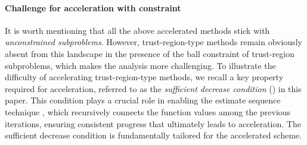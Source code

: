 \documentclass{article}
\theoremstyle{plain}
\theoremstyle{definition}
\theoremstyle{remark}
\newcommand{\cz}[1]{{\color{rr} #1}}
\begin{document}
\paragraph{Challenge for acceleration with constraint}
It is worth mentioning that all the above accelerated methods stick with \emph{unconstrained subproblems}.
However, trust-region-type methods remain obviously absent from this landscape in the presence of the ball constraint of trust-region subproblems, which makes the analysis more challenging. To illustrate the difficulty of accelerating trust-region-type methods, we recall a key property required for acceleration, referred to as the \emph{sufficient decrease condition} () in this paper. This condition plays a crucial role in enabling the estimate sequence technique \cite{baesEstimateSequenceMethods2009a,nesterov_lectures_2018}, which recursively connects the function values among the previous iterations, ensuring consistent progress that ultimately leads to acceleration. The sufficient decrease condition is fundamentally tailored for the accelerated scheme.






\end{document}
